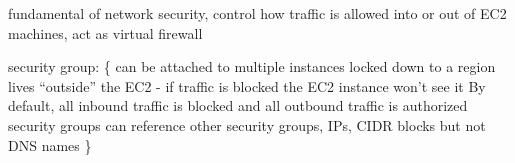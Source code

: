 fundamental of network security, control how traffic is allowed into or out of EC2 machines, act as virtual firewall 

security group:
\{
  \> can be attached to multiple instances
  \> locked down to a region
  \> lives ``outside'' the EC2 - if traffic is blocked the EC2 instance won't see it
  \> By default, all inbound traffic is {\color{red} blocked} and all outbound traffic is {\color{green} authorized}
  \> security groups can reference other security groups, IPs, CIDR blocks but not DNS names
\}